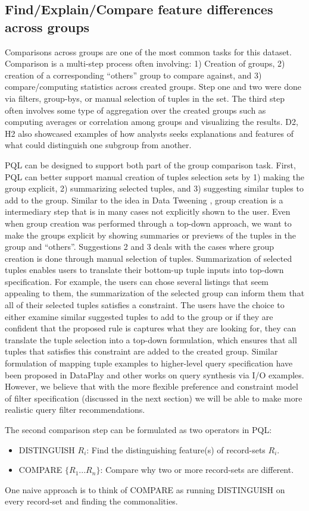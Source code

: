 \documentclass{sig-alternate-05-2015}
\begin{document}
\subsection{Find/Explain/Compare feature differences across groups}
  Comparisons across groups are one of the most common tasks for this dataset. Comparison is a multi-step process often involving: 1) Creation of groups, 2) creation of a corresponding ``others'' group to compare against, and 3) compare/computing statistics across created groups. Step one and two were done via filters, group-bys, or manual selection of tuples in the set. The third step often involves some type of aggregation over the created groups such as computing averages or correlation among groups and visualizing the results. D2, H2 also showcased examples of how analysts seeks explanations and features of what could distinguish one subgroup from another. 
  \par PQL can be designed to support both part of the group comparison task. First, PQL can better support manual creation of tuples selection sets by 1) making the group explicit, 2) summarizing selected tuples, and 3) suggesting similar tuples to add to the group. Similar to the idea in Data Tweening \cite{Khan2017}, group creation is a intermediary step that is in many cases not explicitly shown to the user. Even when group creation was performed through a top-down approach, we want to make the groups explicit by showing summaries or previews of the tuples in the group and ``others''. Suggestions 2 and 3 deals with the cases where group creation is done through manual selection of tuples. Summarization of selected tuples enables users to translate their bottom-up tuple inputs into top-down specification. For example, the users can chose several listings that seem appealing to them, the summarization of the selected group can inform them that all of their selected tuples satisfies a constraint. The users have the choice to either examine similar suggested tuples to add to the group or if they are confident that the proposed rule is captures what they are looking for, they can translate the tuple selection into a top-down formulation, which ensures that all tuples that satisfies this constraint are added to the created group. Similar formulation of mapping tuple examples to higher-level query specification have been proposed in DataPlay\cite{Abouzied2012} and other works on query synthesis via I/O examples\cite{Wang2017,Wang2017a}. However, we believe that with the more flexible preference and constraint model of filter specification (discussed in the next section) we will be able to make more realistic query filter recommendations.
  \par The second comparison step can be formulated as two operators in PQL:
  \begin{itemize}
  \item DISTINGUISH $R_i$: Find the distinguishing feature(s) of record-sets $R_i$. 
  \item COMPARE $\{R_1 ...R_n\}$: Compare why two or more record-sets are different.
  \end{itemize}
  One naive approach is to think of COMPARE as running DISTINGUISH on every record-set and finding the commonalities. 
\end{document}
